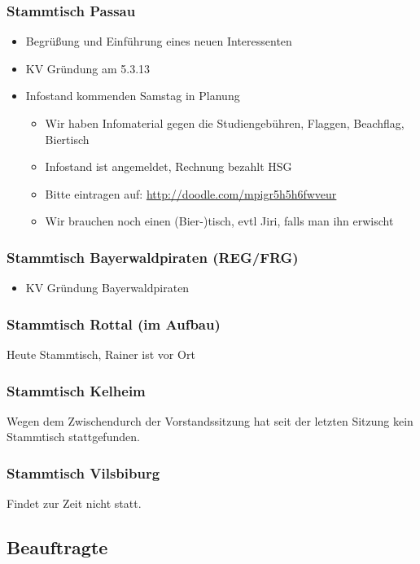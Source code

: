 \documentclass{protokoll}
\begin{document}
\subsubsection{Stammtisch Passau}
\begin{itemize}
\item Begrüßung und Einführung eines neuen Interessenten
\item KV Gründung am 5.3.13
\item Infostand kommenden Samstag in Planung
  \begin{itemize}
  \item Wir haben Infomaterial gegen die Studiengebühren, Flaggen, Beachflag, Biertisch
  \item Infostand ist angemeldet, Rechnung bezahlt HSG
  \item Bitte eintragen auf: \url{http://doodle.com/mpigr5h5h6fwveur}
  \item Wir brauchen noch einen (Bier-)tisch, evtl Jiri, falls man ihn erwischt
  \end{itemize}
\end{itemize}

\subsubsection{Stammtisch Bayerwaldpiraten (REG/FRG)}
\begin{itemize}
\item KV Gründung Bayerwaldpiraten
\end{itemize}

\subsubsection{Stammtisch Rottal (im Aufbau)}
Heute Stammtisch, Rainer ist vor Ort

\subsubsection{Stammtisch Kelheim}
Wegen dem Zwischendurch der Vorstandssitzung hat seit der letzten Sitzung kein Stammtisch stattgefunden.

\subsubsection{Stammtisch Vilsbiburg}
Findet zur Zeit nicht statt.

\subsection{Beauftragte}
\end{document}
